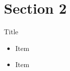 	\section{Section 2}
	
	\begin{frame}{Title}
		\begin{itemize}
			\item Item
			\item Item
		\end{itemize}
	\end{frame}